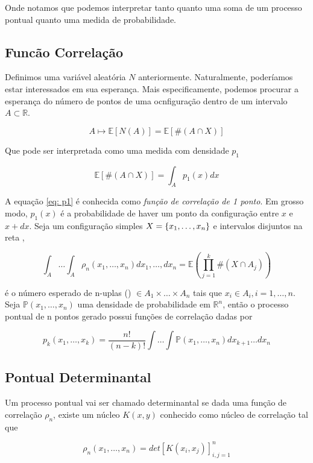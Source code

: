Onde notamos que podemos interpretar tanto quanto uma soma de um processo pontual quanto uma medida de probabilidade.


\subsection{Funcão Correlação}

Definimos uma variável aleatória $N$ anteriormente. Naturalmente, poderíamos estar interessados em sua esperança. Mais especificamente, podemos procurar a esperança do número de pontos de uma ocnfiguração dentro de um intervalo $A \subset \mathbb{R}$.

\[
	A \mapsto \mathbb{E}[N(A)] = \mathbb{E}[\#(A \cap X)]	
\]

Que pode ser interpretada como uma medida com densidade $p_1$

\begin{equation}
	\mathbb{E}[\#(A \cap X)] = \int_{A} p_1(x) dx
	\label{eq: p1}
\end{equation}

A equação \ref{eq: p1} é conhecida como \textit{função de correlação de 1 ponto}. Em grosso modo, $p_1(x)$ é a probabilidade de haver um ponto da configuração entre $x$ e $x+dx$. Seja um configuração simples $X = \{x_1, \dots, x_n\}$ e intervalos disjuntos na reta ,

\[
	\int_A \dots \int_A \rho_n(x_1, \dots, x_n) dx_1, \dots, dx_n = \mathbb{E} \left( \prod_{j=1}^{k} \# (X \cap A_j) \right) 
\]

é o número esperado de n-uplas () $\in A_1 \times \dots \times A_n$ tais que $x_i \in A_i, i=1,\dots,n$. Seja $\mathbb{P}(x_1, \dots, x_n)$ uma densidade de probabilidade em $\mathbb{R}^n$, então o processo pontual de n pontos gerado possui funções de correlação dadas por

\[
	p_k(x_1, \dots, x_k) = \frac{n!}{(n-k)!} \int \dots \int \mathbb{P}(x_1, \dots, x_n) dx_{k+1}\dots dx_n
\]


\subsection{Pontual Determinantal}

Um processo pontual vai ser chamado determinantal se dada uma função de correlação $\rho_n$, existe um núcleo $K(x, y)$ conhecido como núcleo de correlação tal que

\begin{equation}
	\rho_n(x_1, \dots, x_n) = det[K(x_i, x_j)]_{i,j=1}^{n}
	\label{eq: pontualdet}
\end{equation}

